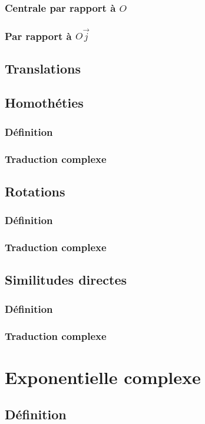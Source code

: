 \documentclass[12pt,a4paper,french]{book}
\begin{document}
			\subsubsection{Centrale par rapport à $O$}
			\subsubsection{Par rapport à $O\overrightarrow{j}$}
		\subsection{Translations}
		\subsection{Homothéties}
			\subsubsection{Définition}
			\subsubsection{Traduction complexe}
		\subsection{Rotations}
			\subsubsection{Définition}
			\subsubsection{Traduction complexe}
		\subsection{Similitudes directes}
			\subsubsection{Définition}
			\subsubsection{Traduction complexe}
	\section{Exponentielle complexe}
		\subsection{Définition}
\end{document}
